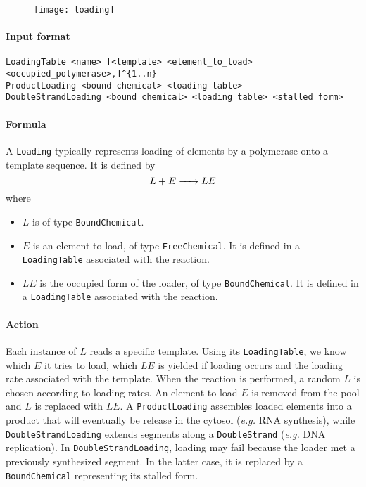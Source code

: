 \begin{figure}[!ht]
	\centering
	\texttt{[image: loading]}
\end{figure}

\paragraph{Input format}
\begin{verbatim}
LoadingTable <name> [<template> <element_to_load> <occupied_polymerase>,]^{1..n}
ProductLoading <bound chemical> <loading table>
DoubleStrandLoading <bound chemical> <loading table> <stalled form>
\end{verbatim}

\paragraph{Formula} A \texttt{Loading} typically represents loading of elements by a polymerase onto a template sequence. It is defined by
$$
	\reactionIrr{L + E}{LE}{}{}
$$
where
\begin{itemize}
	\item $L$ is of type \texttt{BoundChemical}.
	\item $E$ is an element to load, of type \texttt{FreeChemical}. It is defined in a \texttt{LoadingTable} associated with the reaction.
	\item $LE$ is the occupied form of the loader, of type \texttt{BoundChemical}. It is defined in a \texttt{LoadingTable} associated with the reaction.
\end{itemize}

\paragraph{Action} Each instance of $L$ reads a specific template. Using its \texttt{LoadingTable}, we know which $E$ it tries to load, which $LE$ is yielded if loading occurs and the loading rate associated with the template. When the reaction is performed, a random $L$ is chosen according to loading rates. An element to load $E$ is removed from the pool and $L$ is replaced with $LE$. A \texttt{ProductLoading} assembles loaded elements into a product that will eventually be release in the cytosol (\textit{e.g.} RNA synthesis), while \texttt{DoubleStrandLoading} extends segments along a \texttt{DoubleStrand} (\textit{e.g.} DNA replication). In \texttt{DoubleStrandLoading}, loading may fail because the loader met a previously synthesized segment. In the latter case, it is replaced by a \texttt{BoundChemical} representing its stalled form.

